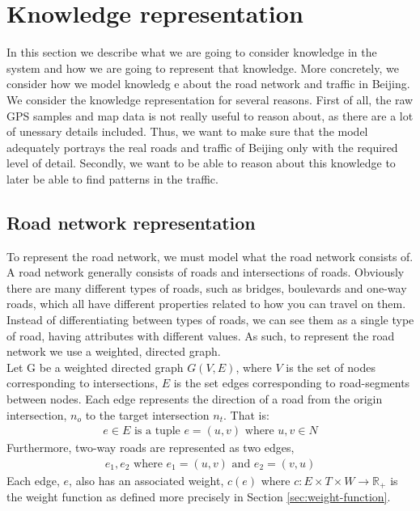 \section{Knowledge representation}
In this section we describe what we are going to consider knowledge in the system and how we are going to represent that knowledge. More concretely, we consider how we model knowledg
e about the road network and traffic in Beijing. We consider the knowledge representation for several reasons. First of all, the raw GPS samples and map data is not really useful to reason about, as there are a lot of unessary details included. Thus, we want to make sure that the model adequately portrays the real roads and traffic of Beijing only with the required level of detail. Secondly, we want to be able to reason about this knowledge to later be able to find patterns in the traffic.

\subsection{Road network representation}\label{sec:road-network-rep}
To represent the road network, we must model what the road network consists of. A road network generally consists of roads and intersections of roads. Obviously there are many different types of roads, such as bridges, boulevards and one-way roads, which all have different properties related to how you can travel on them. Instead of differentiating between types of roads, we can see them as a single type of road, having attributes with different values. As such, to represent the road network we use a weighted, directed graph.\\
Let G be a weighted directed graph $G(V,E)$, where $V$ is the set of nodes corresponding to intersections, $E$ is the set edges corresponding to road-segments between nodes. Each edge represents the direction of a road from the origin intersection, $n_o$ to the target intersection $n_t$. That is:
\begin{align*}
  e \in E \text{ is a tuple } e=(u, v) \text{ where } u, v \in N
\end{align*}
Furthermore, two-way roads are represented as two edges,
\begin{align*}
  e_1, e_2 \text{ where } e_1 = (u, v) \text{ and } e_2=(v, u)
\end{align*}
Each edge, $e$, also has an associated weight, $c(e)$ where  $c: E \times T \times W \rightarrow \mathbb R_+$ is the weight function as defined more precisely in Section \ref{sec:weight-function}. 

